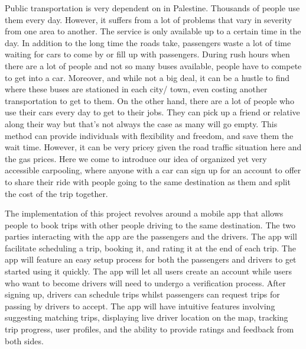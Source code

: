 \documentclass[a4paper, 12pt]{report} %
\begin{document}
            Public transportation is very dependent on in Palestine. Thousands of people use them every day. However, it suffers from a lot of problems that vary in severity from one area to another. The service is only available up to a certain time in the day. In addition to the long time the roads take, passengers waste a lot of time waiting for cars to come by or fill up with passengers. During rush hours when there are a lot of people and not so many buses available, people have to compete to get into a car. Moreover, and while not a big deal, it can be a hustle to find where these buses are stationed in each city/ town, even costing another transportation to get to them. On the other hand, there are a lot of people who use their cars every day to get to their jobs. They can pick up a friend or relative along their way but that's not always the case as many will go empty. This method can provide individuals with flexibility and freedom, and save them the wait time. However, it can be very pricey given the road traffic situation here and the gas prices. Here we come to introduce our idea of organized yet very accessible carpooling, where anyone with a car can sign up for an account to offer to share their ride with people going to the same destination as them and split the cost of the trip together. 

            The implementation of this project revolves around a mobile app that allows people to book trips with other people driving to the same destination. The two parties interacting with the app are the passengers and the drivers. The app will facilitate scheduling a trip, booking it, and rating it at the end of each trip. The app will feature an easy setup process for both the passengers and drivers to get started using it quickly. The app will let all users create an account while users who want to become drivers will need to undergo a verification process. After signing up, drivers can schedule trips whilst passengers can request trips for passing by drivers to accept. The app will have intuitive features involving suggesting matching trips, displaying live driver location on the map, tracking trip progress, user profiles, and the ability to provide ratings and feedback from both sides. 
        
            
\end{document}
